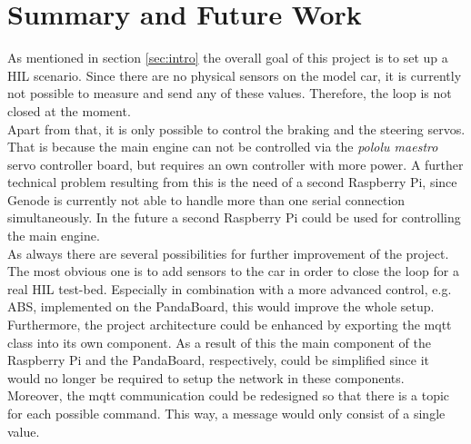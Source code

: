 \section{Summary and Future Work}
As mentioned in section \ref{sec:intro} the overall goal of this project is to set up a HIL scenario. Since there are no physical sensors on the model car, it is currently not possible to measure and send any of these values. Therefore, the loop is not closed at the moment. \\

Apart from that, it is only possible to control the braking and the steering servos. That is because the main engine can not be controlled via the \textit{pololu maestro} servo controller board, but requires an own controller with more power. A further technical problem resulting from this is the need of a second Raspberry Pi, since Genode is currently not able to handle more than one serial connection simultaneously. In the future a second Raspberry Pi could be used for controlling the main engine. \\

As always there are several possibilities for further improvement of the project. The most obvious one is to add sensors to the car in order to close the loop for a real HIL test-bed. Especially in combination with a more advanced control, e.g. ABS, implemented on the PandaBoard, this would improve the whole setup. \\

Furthermore, the project architecture could be enhanced by exporting the mqtt class into its own component. As a result of this the main component of the Raspberry Pi and the PandaBoard, respectively, could be simplified since it would no longer be required to setup the network in these components. \\

Moreover, the mqtt communication could be redesigned so that there is a topic for each possible command. This way, a message would only consist of a single value.
